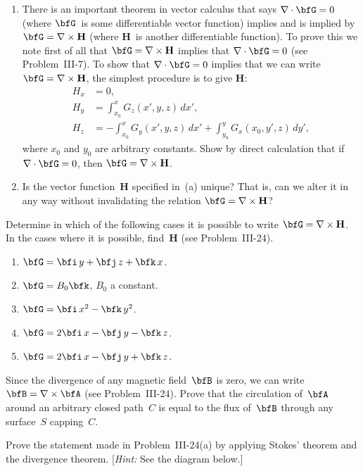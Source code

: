 \begin{problems}
\prob
\begin{enumerate}[label=(\alph*)]
\item There is an important theorem in vector calculus that says
$\nabla\cdot\bfG=0$ (where $\bfG$~is some differentiable vector
function) implies and is implied by $\bfG=\nabla\times\mathbf{H}$
(where $\mathbf{H}$~is another differentiable function).  To prove this
we note first of all that $\bfG=\nabla\times\mathbf{H}$ implies that
$\nabla\cdot\bfG=0$ (see Problem~III-7).  To show that
$\nabla\cdot\bfG=0$ implies that we can write
$\bfG=\nabla\times\mathbf{H}$, the simplest procedure is to give
$\mathbf{H}$:
\begin{align*}
  H_x &= 0, \\
  H_y &= \int_{x_0}^{x}G_z(x',y,z)\,dx', \\
  H_z &= -\int_{x_0}^{x}G_y(x',y,z)\,dx'
        + \int_{y_0}^{y}G_x(x_0,y',z)\,dy',
\end{align*}
where $x_0$ and $y_0$ are arbitrary constants.  Show by direct
calculation that if $\nabla\cdot\bfG=0$, then
$\bfG=\nabla\times\mathbf{H}$.
\item Is the vector function~$\mathbf{H}$ specified in~(a) unique?
That is, can we alter it in any way without invalidating the relation
$\bfG=\nabla\times\mathbf{H}$?
\end{enumerate}

\prob
Determine in which of the following cases it is possible to write
$\bfG=\nabla\times\mathbf{H}$.  In the cases where it is possible,
find~$\mathbf{H}$ (see Problem~III-24).
\begin{enumerate}[label=(\alph*)]
\item $\bfG = \bfi\,y + \bfj\,z + \bfk\,x$.
\item $\bfG = B_0\bfk$, \;$B_0$ a constant.
\item $\bfG = \bfi\,x^2 - \bfk\,y^2$.
\item $\bfG = 2\bfi\,x - \bfj\,y - \bfk\,z$.
\item $\bfG = 2\bfi\,x - \bfj\,y + \bfk\,z$.
\end{enumerate}

\prob
Since the divergence of any magnetic field~$\bfB$ is zero, we can
write $\bfB=\nabla\times\bfA$ (see Problem~III-24).  Prove that the
circulation of~$\bfA$ around an arbitrary closed path~$C$ is equal to
the flux of~$\bfB$ through any surface~$S$ capping~$C$.

\prob
Prove the statement made in Problem~III-24(a) by applying Stokes'
theorem and the divergence theorem.  [\emph{Hint:} See the diagram
below.]


\end{problems}
